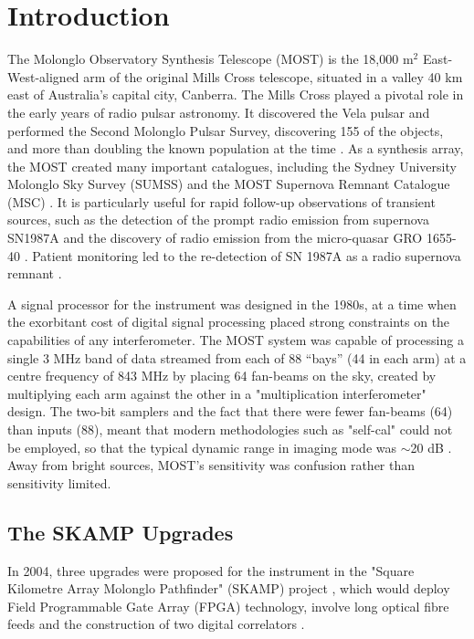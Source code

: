 \section{Introduction} 
The Molonglo Observatory Synthesis Telescope (MOST) is the 18,000 m$^2$ East-West-aligned arm of the original Mills Cross telescope, situated in a valley 40 km east of Australia's capital city, Canberra. The Mills Cross played a pivotal role in the early years of radio pulsar astronomy. It discovered the Vela pulsar \citep{Large_1968} and performed the Second Molonglo Pulsar Survey, discovering 155 of the objects, and more than doubling the known population at the time \citep{Manchester_1978}. As a synthesis array, the MOST created many important catalogues, including the Sydney University Molonglo Sky Survey (SUMSS) \citep{Bock_1999,Mauch_2003} and the MOST Supernova Remnant Catalogue (MSC) \citep{Whiteoak_1996}. It is particularly useful for rapid follow-up observations of transient sources, such as the detection of the prompt radio emission from supernova SN1987A \citep{Turtle_1987} and the discovery of radio emission from the micro-quasar GRO 1655-40 \citep{Tingay_1995}. Patient monitoring led to the re-detection of SN 1987A as a radio supernova remnant \citep{Staveley_Smith_1992}.

A signal processor \citep{Robertson_1991} for the instrument was designed in the 1980s, at a time when the exorbitant cost of digital signal processing placed strong constraints on the capabilities of any interferometer. The MOST system was capable of processing a single 3 MHz band of data streamed from each of 88 ``bays'' (44 in each arm) at a centre frequency of 843 MHz by placing 64 fan-beams on the sky, created by multiplying each arm against the other in a "multiplication interferometer" design. The two-bit samplers and the fact that there were fewer fan-beams (64) than inputs (88), meant that modern methodologies such as "self-cal" could not be employed, so that the typical dynamic range in imaging mode was $\sim$20 dB \citep{Robertson_1991}. Away from bright sources, MOST's sensitivity was confusion rather than sensitivity limited.

\subsection{The SKAMP Upgrades}
In 2004, three upgrades were proposed for the instrument in the "Square Kilometre Array Molonglo Pathfinder" (SKAMP) project \cite{Adams_2004}, which would deploy Field Programmable Gate Array (FPGA) technology, involve long optical fibre feeds and the construction of two digital correlators \citep{Adams_2004}. 

